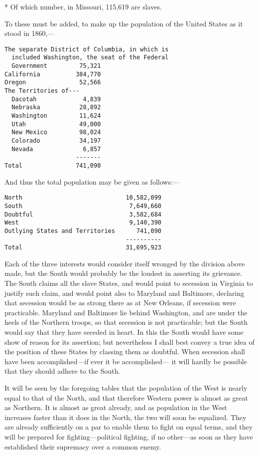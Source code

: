 * Of which number, in Missouri, 115,619 are slaves.


To these must be added, to make up the population of the United
States as it stood in 1860,---%

{\small
\begin{verbatim}
The separate District of Columbia, in which is
  included Washington, the seat of the Federal
  Government         75,321
California          384,770
Oregon               52,566
The Territories of---
  Dacotah             4,839
  Nebraska           28,892
  Washington         11,624
  Utah               49,000
  New Mexico         98,024
  Colorado           34,197
  Nevada              6,857
                    -------
Total               741,090
\end{verbatim}}


And thus the total population may be given as follows:---%

{\small
\begin{verbatim}
North                             10,582,099
South                              7,649,660
Doubtful                           3,582,684
West                               9,140,390
Outlying States and Territories      741,090
                                  ----------
Total                             31,695,923
\end{verbatim}}


Each of the three interests would consider itself wronged by the
division above made, but the South would probably be the loudest in
asserting its grievance.  The South claims all the slave States,
and would point to secession in Virginia to justify such claim, and
would point also to Maryland and Baltimore, declaring that
secession would be as strong there as at New Orleans, if secession
were practicable.  Maryland and Baltimore lie behind Washington,
and are under the heels of the Northern troops, so that secession
is not practicable; but the South would say that they have seceded
in heart.  In this the South would have some show of reason for its
assertion; but nevertheless I shall best convey a true idea of the
position of these States by classing them as doubtful.  When
secession shall have been accomplished---if ever it be accomplished---%
it will hardly be possible that they should adhere to the South.

It will be seen by the foregoing tables that the population of the
West is nearly equal to that of the North, and that therefore
Western power is almost as great as Northern.  It is almost as
great already, and as population in the West increases faster than
it does in the North, the two will soon be equalized.  They are
already sufficiently on a par to enable them to fight on equal
terms, and they will be prepared for fighting---political fighting,
if no other---as soon as they have established their supremacy over
a common enemy.

